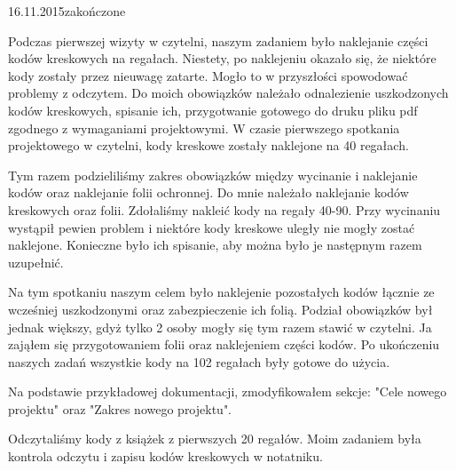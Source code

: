  {16.11.2015}{zakończone} 


Podczas pierwszej wizyty w czytelni, naszym zadaniem było naklejanie części kodów kreskowych na regałach. Niestety, po naklejeniu okazało się, że niektóre kody zostały przez nieuwagę zatarte. Mogło to w przyszłości spowodować problemy z odczytem. Do moich obowiązków należało odnalezienie uszkodzonych kodów kreskowych, spisanie ich, przygotwanie gotowego do druku pliku pdf zgodnego z wymaganiami projektowymi. W czasie pierwszego spotkania projektowego w czytelni, kody kreskowe zostały naklejone na 40 regałach.


Tym razem podzieliliśmy zakres obowiązków między wycinanie i naklejanie kodów oraz naklejanie folii ochronnej. Do mnie należało naklejanie kodów kreskowych oraz folii. Zdołaliśmy nakleić kody na regały 40-90. Przy wycinaniu wystąpił pewien problem i niektóre kody kreskowe uległy nie mogły zostać naklejone. Konieczne było ich spisanie, aby można było je następnym razem uzupełnić.


Na tym spotkaniu naszym celem było naklejenie pozostałych kodów łącznie ze wcześniej uszkodzonymi oraz zabezpieczenie ich folią. Podział obowiązków był jednak większy, gdyż tylko 2 osoby mogły się tym razem stawić w czytelni. Ja zająłem się przygotowaniem folii oraz naklejeniem części kodów. Po ukończeniu naszych zadań wszystkie kody na 102 regałach były gotowe do użycia.  


Na podstawie przykładowej dokumentacji, zmodyfikowałem sekcje: "Cele nowego projektu" oraz "Zakres nowego projektu".


Odczytaliśmy kody z książek z pierwszych 20 regałów. Moim zadaniem była kontrola odczytu i zapisu kodów kreskowych w notatniku.










